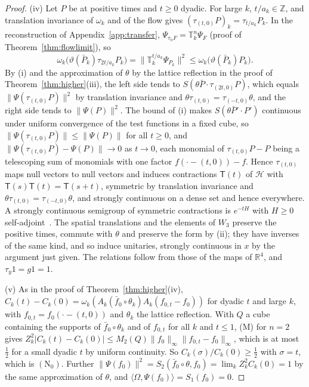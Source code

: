 \documentclass[aps,prd,twocolumn,superscriptaddress,nofootinbib,longbibliography,floatfix,amsmath,amssymb,10pt]{revtex4-2}
\theoremstyle{definition}
\theoremstyle{remark}
\newcommand{\R}{\mathbb{R}}
\newcommand{\Z}{\mathbb{Z}}
\newcommand{\ip}[2]{\langle #1,#2\rangle}
\begin{document}
\begin{proof}
(iv) Let $P$ be at positive times and $t\ge0$ dyadic. For large $k$,
$t/a_k\in\Z$, and translation invariance of $\omega_k$ and of the flow gives
$(\tau_{(t,0)}P)_k=\tau_{t/a_k}P_k$. In the reconstruction of
Appendix~\ref{app:transfer}, $\Psi_{\tau_nF}=\mathbb T_k^n\Psi_F$ (proof of
Theorem~\ref{thm:flowlimit}), so
\[
\omega_k\bigl(\vartheta(\bar P_k)\tau_{2t/a_k}P_k\bigr)
=\bigl\|\mathbb T_k^{t/a_k}\Psi_{P_k}\bigr\|^2\le
\omega_k\bigl(\vartheta(\bar P_k)P_k\bigr).
\]
By (i) and the approximation of $\theta$ by the lattice reflection in the
proof of Theorem~\ref{thm:higher}(iii), the left side tends to
$S(\theta\bar P\cdot\tau_{(2t,0)}P)$, which equals
$\|\Psi(\tau_{(t,0)}P)\|^2$ by translation invariance and
$\theta\tau_{(t,0)}=\tau_{(-t,0)}\theta$, and the right side tends to
$\|\Psi(P)\|^2$. The bound of (i) makes $S(\theta\bar P'\cdot P')$
continuous under uniform convergence of the test functions in a fixed cube,
so $\|\Psi(\tau_{(t,0)}P)\|\le\|\Psi(P)\|$ for all $t\ge0$, and
$\|\Psi(\tau_{(t,0)}P)-\Psi(P)\|\to0$ as $t\to0$, each monomial of
$\tau_{(t,0)}P-P$ being a telescoping sum of monomials with one factor
$f(\cdot-(t,0))-f$. Hence $\tau_{(t,0)}$ maps null vectors to null vectors
and induces contractions $\mathsf T(t)$ of $\mathcal H$ with
$\mathsf T(s)\mathsf T(t)=\mathsf T(s+t)$, symmetric by translation
invariance and $\theta\tau_{(t,0)}=\tau_{(-t,0)}\theta$, and strongly
continuous on a dense set and hence everywhere. A strongly continuous
semigroup of symmetric contractions is $e^{-tH}$ with $H\ge0$
self-adjoint~\cite{OS73}. The spatial translations and the elements of
$W_3$ preserve the positive times, commute with $\theta$ and preserve the
form by (ii); they have inverses of the same kind, and so induce unitaries,
strongly continuous in $x$ by the argument just given. The relations follow
from those of the maps of $\R^4$, and $\tau_y1=g1=1$.

(v) As in the proof of Theorem~\ref{thm:higher}(iv),
$C_k(t)-C_k(0)=\omega_k(A_k(\bar f_0\circ\theta_k)A_k(f_{0,t}-f_0))$ for
dyadic $t$ and large $k$, with $f_{0,t}=f_0(\cdot-(t,0))$ and $\theta_k$ the
lattice reflection. With $Q$ a cube containing the supports of
$\bar f_0\circ\theta_k$ and of $f_{0,t}$ for all $k$ and $t\le1$, (M) for
$n=2$ gives $Z_k^2|C_k(t)-C_k(0)|\le M_2(Q)\|f_0\|_\infty
\|f_{0,t}-f_0\|_\infty$, which is at most $\frac12$ for a small dyadic $t$
by uniform continuity. So $C_k(\sigma)/C_k(0)\ge\frac12$ with $\sigma=t$,
which is $(\mathrm N_0)$. Further $\|\Psi(f_0)\|^2=S_2(\bar f_0\circ\theta,
f_0)=\lim_kZ_k^2C_k(0)=1$ by the same approximation of $\theta$, and
$\ip\Omega{\Psi(f_0)}=S_1(f_0)=0$.


\end{proof}
\end{document}
